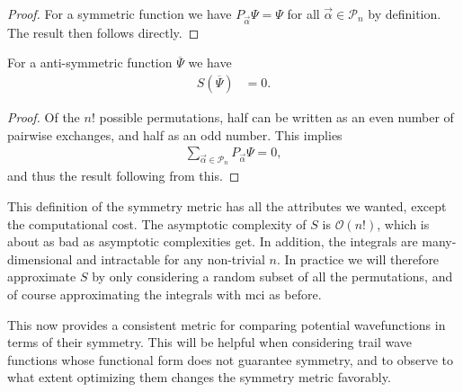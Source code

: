 \documentclass[Thesis.tex]{subfiles}
\begin{document}
\begin{proof}
    For a symmetric function we have $P_{\vec\alpha}\Psi=\Psi$ for all
    $\vec\alpha\in\mathcal{P}_n$ by definition. The result then follows directly.\end{proof}
\begin{corollary}
    For a anti-symmetric function $\overline\Psi$ we have
    \begin{align}
        S(\overline\Psi)&=0.
    \end{align}
\end{corollary}
\begin{proof}
   Of the $n!$ possible permutations, half can be written as an even number of
    pairwise exchanges, and half as an odd number. This implies
    \begin{align}
        \sum_{\vec\alpha\in \mathcal{P}_n} P_{\vec\alpha}\Psi = 0,
    \end{align}
    and thus the result following from this.
\end{proof}

This definition of the symmetry metric has all the attributes we wanted, except
the computational cost. The asymptotic complexity of $S$ is $\mathcal{O}(n!)$,
which is about as bad as asymptotic complexities get. In addition, the integrals
are many-dimensional and intractable for any non-trivial $n$. In practice we
will therefore approximate $S$ by only considering a random subset of all the
permutations, and of course approximating the integrals with \gls{mci} as before.

This now provides a consistent metric for comparing potential wavefunctions in
terms of their symmetry. This will be helpful when considering trail
wave functions whose functional form does not guarantee symmetry, and to observe
to what extent optimizing them changes the symmetry metric favorably.
\end{document}
